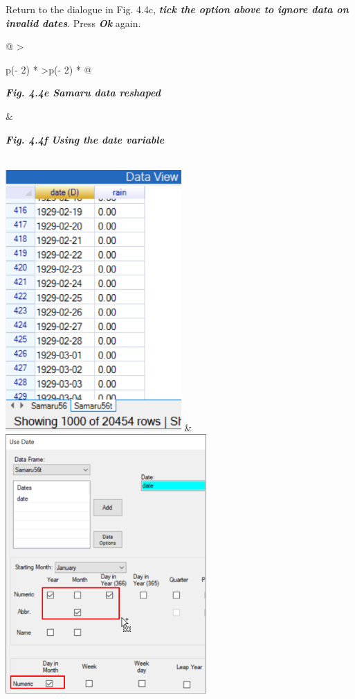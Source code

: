 \documentclass[
  letterpaper,
  DIV=11,
  numbers=noendperiod]{scrreprt}
\begin{document}
Return to the dialogue in Fig. 4.4c, \textbf{\emph{tick the option above
to ignore data on invalid dates}}. Press \textbf{\emph{Ok}} again.

\begin{longtable}[]{@{}
  >{\raggedright\arraybackslash}p{(\columnwidth - 2\tabcolsep) * }
  >{\raggedleft\arraybackslash}p{(\columnwidth - 2\tabcolsep) * }@{}}
\toprule\noalign{}
\begin{minipage}[b]{\linewidth}\raggedright
\textbf{\emph{Fig. 4.4e Samaru data reshaped}}
\end{minipage} & \begin{minipage}[b]{\linewidth}\raggedleft
\textbf{\emph{Fig. 4.4f Using the date variable}}
\end{minipage} \\
\midrule\noalign{}
\endhead
\bottomrule\noalign{}
\endlastfoot
\includegraphics[width=2.64161in,height=\textheight]{figures/Fig4.4e.png}
&
\includegraphics[width=3.01996in,height=3.88967in]{figures/Fig4.4f.png} \\
\end{longtable}
\end{document}

